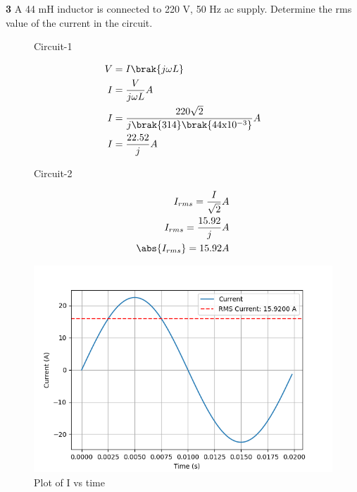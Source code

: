 \documentclass[journal,12pt,twocolumn]{IEEEtran}
\begin{document}


\vspace{3cm}

\title{}
\author{EE23BTECH11047 - Deepakreddy P
}
\maketitle
\newpage
\bigskip


\noindent \textbf{3} \quad A 44 mH inductor is connected to 220 V, 50 Hz ac supply. Determine
the rms value of the current in the circuit.\\
\solution
\fi


\begin{figure}[ht]
  \centering
      
  \caption{Circuit-1}
\end{figure}

\begin{align}
    V &= I \brak{j \omega L} \\
    I &= \frac{V}{j \omega L} A \\
    I &= \frac{220 \sqrt{2}}{j \brak{314} \brak{44 \text{x} 10^{-3}}}A\\
    I &= \frac{22.52}{j}A
\end{align}


\begin{figure}[ht]
  \centering

      

  \caption{Circuit-2}
\end{figure}

\begin{align}
    I_{rms} = \frac{I}{\sqrt{2}}A\\
    I_{rms} = \frac{15.92}{j}A\\
    \abs{I_{rms}} = 15.92 A
\end{align}

\begin{figure}[ht]
   \centering
   \includegraphics[width=1.1\columnwidth]{ncert-physics/12/7/3/figs/ac.png}
   \caption{Plot of I vs time}
\end{figure}
\end{document}

